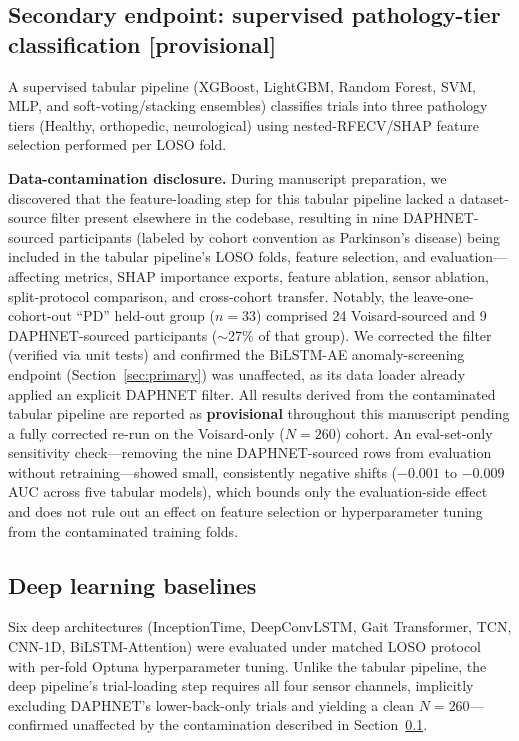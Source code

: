 \documentclass[11pt,a4paper]{article}
\begin{document}
\subsection{Secondary endpoint: supervised pathology-tier classification [provisional]}
\label{sec:tabular}

A supervised tabular pipeline (XGBoost, LightGBM, Random Forest, SVM, MLP, and soft-voting/stacking ensembles) classifies trials into three pathology tiers (Healthy, orthopedic, neurological) using nested-RFECV/SHAP feature selection performed per LOSO fold.

\textbf{Data-contamination disclosure.} During manuscript preparation, we discovered that the feature-loading step for this tabular pipeline lacked a dataset-source filter present elsewhere in the codebase, resulting in nine DAPHNET-sourced participants (labeled by cohort convention as Parkinson's disease) being included in the tabular pipeline's LOSO folds, feature selection, and evaluation---affecting metrics, SHAP importance exports, feature ablation, sensor ablation, split-protocol comparison, and cross-cohort transfer. Notably, the leave-one-cohort-out ``PD'' held-out group ($n=33$) comprised 24 Voisard-sourced and 9 DAPHNET-sourced participants ($\sim$27\% of that group). We corrected the filter (verified via unit tests) and confirmed the BiLSTM-AE anomaly-screening endpoint (Section~\ref{sec:primary}) was unaffected, as its data loader already applied an explicit DAPHNET filter. All results derived from the contaminated tabular pipeline are reported as \textbf{provisional} throughout this manuscript pending a fully corrected re-run on the Voisard-only ($N=260$) cohort. An eval-set-only sensitivity check---removing the nine DAPHNET-sourced rows from evaluation without retraining---showed small, consistently negative shifts ($-0.001$ to $-0.009$ AUC across five tabular models), which bounds only the evaluation-side effect and does not rule out an effect on feature selection or hyperparameter tuning from the contaminated training folds.

\subsection{Deep learning baselines}

Six deep architectures (InceptionTime, DeepConvLSTM, Gait Transformer, TCN, CNN-1D, BiLSTM-Attention) were evaluated under matched LOSO protocol with per-fold Optuna hyperparameter tuning. Unlike the tabular pipeline, the deep pipeline's trial-loading step requires all four sensor channels, implicitly excluding DAPHNET's lower-back-only trials and yielding a clean $N=260$---confirmed unaffected by the contamination described in Section~\ref{sec:tabular}.
\end{document}
